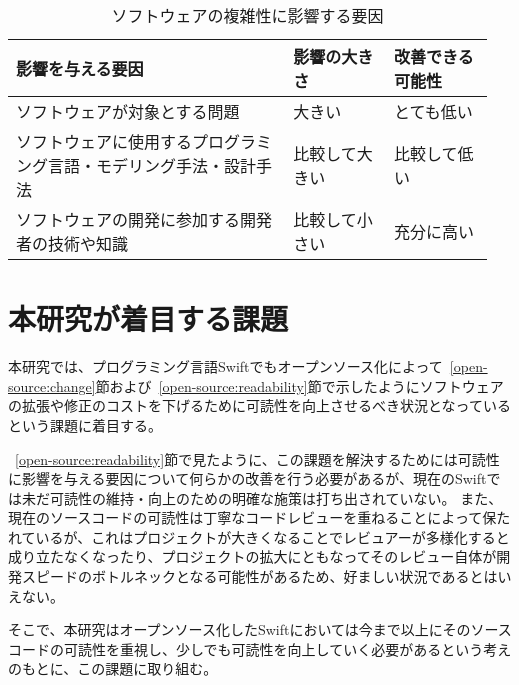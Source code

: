 \begin{table}[!hbtp]
    \begin{center}
        \caption{ソフトウェアの複雑性に影響する要因}
        \begin{tabular}{|p{0.55\linewidth}|p{0.2\linewidth}|p{0.2\linewidth}|}
            \hline
            影響を与える要因 & 影響の大きさ & 改善できる可能性 \\
            \hline
            \hline
            ソフトウェアが対象とする問題 & 大きい & とても低い \\
            \hline
            ソフトウェアに使用するプログラミング言語・モデリング手法・設計手法 & 比較して大きい & 比較して低い \\
            \hline
            ソフトウェアの開発に参加する開発者の技術や知識 & 比較して小さい & 充分に高い \\
            \hline
        \end{tabular}
        \label{table:complexity-elements}
    \end{center}
\end{table}

\section{本研究が着目する課題}
\label{open-source:issue}

本研究では、プログラミング言語Swiftでもオープンソース化によって~\ref{open-source:change}節および~\ref{open-source:readability}節で示したようにソフトウェアの拡張や修正のコストを下げるために可読性を向上させるべき状況となっているという課題に着目する。

~\ref{open-source:readability}節で見たように、この課題を解決するためには可読性に影響を与える要因について何らかの改善を行う必要があるが、現在のSwiftでは未だ可読性の維持・向上のための明確な施策は打ち出されていない。
また、現在のソースコードの可読性は丁寧なコードレビューを重ねることによって保たれているが、これはプロジェクトが大きくなることでレビュアーが多様化すると成り立たなくなったり、プロジェクトの拡大にともなってそのレビュー自体が開発スピードのボトルネックとなる可能性があるため、好ましい状況であるとはいえない。

そこで、本研究はオープンソース化したSwiftにおいては今まで以上にそのソースコードの可読性を重視し、少しでも可読性を向上していく必要があるという考えのもとに、この課題に取り組む。

